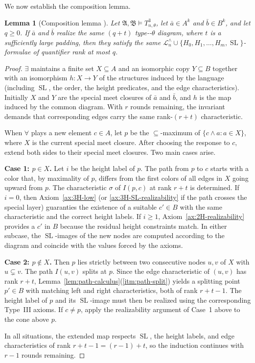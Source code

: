 \documentclass{amsart}
\newtheorem{lemma}{Lemma}
\theoremstyle{definition}
\begin{document}
We now establish the composition lemma.


\begin{lemma}[Composition lemma \MakeUppercase{}]\label{lem:composition3}
    Let $\mathfrak A,\mathfrak B\models T_{n,\theta}^3$, let $\bar a\in A^k$ and $\bar b\in B^k$, and let $q\ge 0$. If $\bar a$ and $\bar b$ realize the same $(q+t)$ type-\MakeUppercase{}-$\theta$ diagram, where $t$ is a sufficiently large padding, then they satisfy the same $\mathcal L_n^\wedge\cup\{H_0,H_1,\dots,H_m,\operatorname{SL}\}$-formulae of quantifier rank at most $q$.
\end{lemma}
\begin{proof}
    $\exists$ maintains a finite set $X\subseteq A$ and an isomorphic copy $Y\subseteq B$ together with an isomorphism $h: X\to Y$ of the structures induced by the language (including $\operatorname{SL}$, the order, the height predicates, and the edge characteristics). Initially $X$ and $Y$ are the special meet closures of $\bar a$ and $\bar b$, and $h$ is the map induced by the common diagram. With $r$ rounds remaining, the invariant demands that corresponding edges carry the same rank-$(r+t)$ characteristic.

    When $\forall$ plays a new element $c\in A$, let $p$ be the $\subseteq$-maximum of $\{c\wedge a:a\in X\}$, where $X$ is the current special meet closure. After choosing the response to $c$, extend both sides to their special meet closures. Two main cases arise.

    \textbf{Case 1: $p\in X$.} Let $i$ be the height label of $p$. The path from $p$ to $c$ starts with a color that, by maximality of $p$, differs from the first colors of all edges in $X$ going upward from $p$. The characteristic $\sigma$ of $I(p,c)$ at rank $r+t$ is determined. If $i=0$, then Axiom~\ref{ax:3H-low} (or \ref{ax:3H-SL-realizability} if the path crosses the special layer) guaranties the existence of a suitable $c'\in B$ with the same characteristic and the correct height labels. If $i\ge 1$, Axiom~\ref{ax:2H-realizability} provides a $c'$ in $B$ because the residual height constraints match. In either subcase, the $\operatorname{SL}$-images of the new nodes are computed according to the diagram and coincide with the values forced by the axioms.

    \textbf{Case 2: $p\notin X$.} Then $p$ lies strictly between two consecutive nodes $u,v$ of $X$ with $u\subsetneq v$. The path $I(u,v)$ splits at $p$. Since the edge characteristic of $(u,v)$ has rank $r+t$, Lemma~\ref{lem:path-calculus}(\ref{itm:path-split}) yields a splitting point $p'\in B$ with matching left and right characteristics, both of rank $r+t-1$. The height label of $p$ and its $\operatorname{SL}$-image must then be realized using the corresponding Type~III axioms. If $c\neq p$, apply the realizability argument of Case~1 above to the cone above $p$.

    In all situations, the extended map respects $\operatorname{SL}$, the height labels, and edge characteristics of rank $r+t-1=(r-1)+t$, so the induction continues with $r-1$ rounds remaining.
\end{proof}
\end{document}
